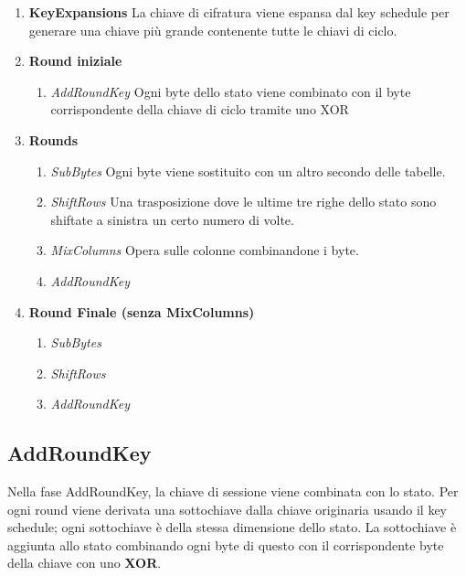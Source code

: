\begin{enumerate}
\item \textbf{KeyExpansions} La chiave di cifratura viene espansa dal key schedule per generare una chiave più grande contenente tutte le chiavi di ciclo.
\item \textbf{Round iniziale}
\begin{enumerate}
\item \textit{AddRoundKey} Ogni byte dello stato viene combinato con il byte corrispondente della chiave di ciclo tramite uno XOR
\end{enumerate}
\item \textbf{Rounds}
\begin{enumerate}
\item \textit{SubBytes} Ogni byte viene sostituito con un altro secondo delle tabelle.
\item \textit{ShiftRows} Una trasposizione dove le ultime tre righe dello stato sono shiftate a sinistra un certo numero di volte.
\item \textit{MixColumns} Opera sulle colonne combinandone i byte.
\item \textit{AddRoundKey}
\end{enumerate}
\item \textbf{Round Finale (senza MixColumns)}
\begin{enumerate}
\item \textit{SubBytes}
\item \textit{ShiftRows}
\item \textit{AddRoundKey}
\end{enumerate}
\end{enumerate}




\subsection{AddRoundKey}
Nella fase AddRoundKey, la chiave di sessione viene combinata con lo stato. Per ogni round viene derivata una sottochiave dalla chiave originaria usando il key schedule; ogni sottochiave è della stessa dimensione dello stato. La sottochiave è aggiunta allo stato combinando ogni byte di questo con il corrispondente byte della chiave con uno \textbf{XOR}. 


